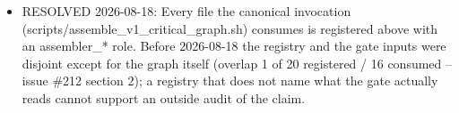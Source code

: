 \begin{itemize}
\item RESOLVED 2026-08-18: Every file the canonical invocation (scripts/assemble\_v1\_critical\_graph.sh) consumes is registered above with an assembler\_* role. Before 2026-08-18 the registry and the gate inputs were disjoint except for the graph itself (overlap 1 of 20 registered / 16 consumed -- issue \#212 section 2); a registry that does not name what the gate actually reads cannot support an outside audit of the claim.
\end{itemize}
